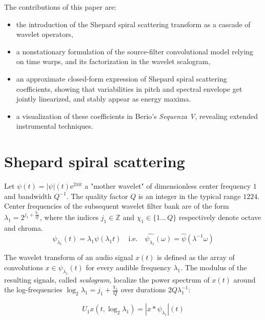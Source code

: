 \documentclass[twoside,a4paper]{article}
\begin{document}
The contributions of this paper are:
\begin{itemize}
\item
the introduction of the Shepard spiral scattering transform as a cascade of wavelet operators,
\item
a nonstationary formulation of the source-filter convolutional model relying on time warps, and its factorization in the wavelet scalogram,
\item
an approximate closed-form expression of Shepard spiral scattering coefficients, showing that variabilities in pitch and spectral envelope get jointly linearized, and stably appear as energy maxima.
\item
a visualization of these coefficients in Berio's \emph{Sequenza V}, revealing extended instrumental techniques.
\end{itemize}

\section{Shepard spiral scattering}

Let $\psi(t)=\vert\psi\vert(t)\mathrm{e}^{2\pi\mathrm{i}t}$ a "mother wavelet" of dimensionless center frequency $1$ and bandwidth $Q^{-1}$. The quality factor $Q$ is an integer in the typical range $12$\textendash$24$.
Center frequencies of the subsequent wavelet filter bank are of the
form $\lambda_{1} = 2^{j_{1} + \frac{\chi_{1}}{Q}}$, where the indices
$j_{1} \in \mathbb{Z}$ and $\chi_1 \in \{1\ldots\,Q\}$ respectively denote
octave and chroma.
\[
\psi_{\lambda_{1}}(t)=\lambda_{1}\psi(\lambda_{1}t)\quad\mathrm{i.e.}\quad\widehat{\psi_{\lambda_{1}}}(\omega)=\widehat{\psi}(\lambda^{-1}\omega)
\]

The wavelet transform of an audio signal $x(t)$ is defined as the array of convolutions $x \in \psi_{\lambda_1}(t)$ for every audible frequency $\lambda_1$. The modulus of the resulting signals, called \emph{scalogram}, localize the power spectrum of $x(t)$ around the log-frequencies $\log_2 \lambda_1 = j_1 + \frac{\chi_1}{Q}$ over durations $2 Q \lambda_1^{-1}$:

\[
U_{1} x (t,\log_{2}\lambda_{1})=\left|x\ast\psi_{\lambda_{1}}\right|(t)
\]


\nocite{*}

 
\end{document}
